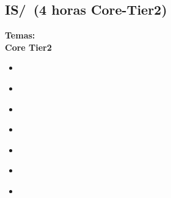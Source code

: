 \subsection{IS/\ISBasicSearchStrategies~(4 horas Core-Tier2)}\label{sec:BOK:ISBasicSearchStrategies}
\noindent \textbf{Temas:}\\
\noindent \textbf{Core Tier2}
\begin{itemize}
	\item \ISBasicSearchStrategiesTopicProblemSpaces\label{sec:BOK:ISBasicSearchStrategiesTopicProblemSpaces}
	\item \ISBasicSearchStrategiesTopicFactored\label{sec:BOK:ISBasicSearchStrategiesTopicFactored}
	\item \ISBasicSearchStrategiesTopicUninformed\label{sec:BOK:ISBasicSearchStrategiesTopicUninformed}
	\item \ISBasicSearchStrategiesTopicHeuristics\label{sec:BOK:ISBasicSearchStrategiesTopicHeuristics}
	\item \ISBasicSearchStrategiesTopicSpace\label{sec:BOK:ISBasicSearchStrategiesTopicSpace}
	\item \ISBasicSearchStrategiesTopicTwo\label{sec:BOK:ISBasicSearchStrategiesTopicTwo}
	\item \ISBasicSearchStrategiesTopicConstraint\label{sec:BOK:ISBasicSearchStrategiesTopicConstraint}
\end{itemize}


